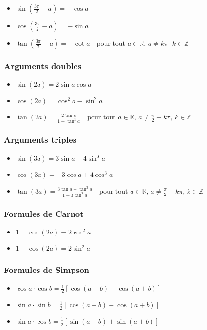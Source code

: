 \documentclass[12]{article}%
\theoremstyle{plain}
\theoremstyle{definition}
\theoremstyle{remark}
\begin{document}
\begin{itemize}
	\item \( \boxed{\sin\left(\frac{3\pi}{2} - a\right) = -\cos a} \)
	\item \( \boxed{\cos\left(\frac{3\pi}{2} - a\right) = -\sin a} \)
	\item \( \boxed{\tan\left(\frac{3\pi}{2} - a\right) = -\cot a} \quad \text{pour tout } a \in \mathbb{R}, \, a \neq k\pi, \, k \in \mathbb{Z} \)
\end{itemize}

\subsubsection{Arguments doubles}
\begin{itemize}
	\item \( \boxed{\sin(2a) = 2 \sin a \cos a} \)
	\item \( \boxed{\cos(2a) = \cos^2 a - \sin^2 a} \)
	\item \( \boxed{\tan(2a) = \frac{2 \tan a}{1 - \tan^2 a}} \quad \text{pour tout } a \in \mathbb{R}, \, a \neq \frac{\pi}{2} + k\pi, \, k \in \mathbb{Z} \)
\end{itemize}

\subsubsection{Arguments triples}
\begin{itemize}
	\item \( \boxed{\sin(3a) = 3 \sin a - 4 \sin^3 a} \)
	\item \( \boxed{\cos(3a) = -3 \cos a + 4 \cos^3 a} \)
	\item \( \boxed{\tan(3a) = \frac{3 \tan a - \tan^3 a}{1 - 3 \tan^2 a}} \quad \text{pour tout } a \in \mathbb{R}, \, a \neq \frac{\pi}{2} + k\pi, \, k \in \mathbb{Z} \)
\end{itemize}

\subsubsection{Formules de Carnot}
\begin{itemize}
	\item \( \boxed{1 + \cos(2a) = 2 \cos^2 a} \)
	\item \( \boxed{1 - \cos(2a) = 2 \sin^2 a} \)
\end{itemize}

\subsubsection{Formules de Simpson}
\begin{itemize}
	\item \( \boxed{\cos a \cdot \cos b = \frac{1}{2} \left[ \cos(a-b) + \cos(a+b) \right]} \)
	\item \( \boxed{\sin a \cdot \sin b = \frac{1}{2} \left[ \cos(a-b) - \cos(a+b) \right]} \)
	\item \( \boxed{\sin a \cdot \cos b = \frac{1}{2} \left[ \sin(a-b) + \sin(a+b) \right]} \)
\end{itemize}
\end{document}

